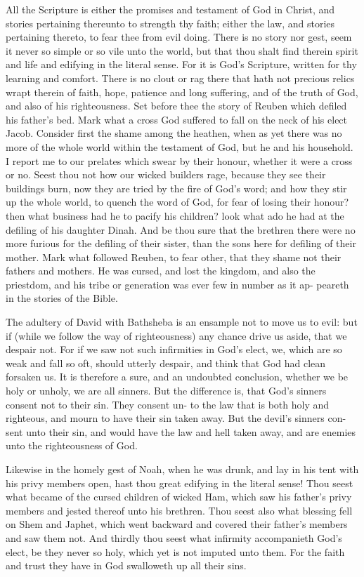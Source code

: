 \documentclass{custom}
\begin{document}
All the Scripture is either the promises and testament of 
God in Christ, and stories pertaining thereunto to strength 
thy faith; either the law, and stories pertaining thereto, to 
fear thee from evil doing. There is no story nor gest, seem it 
never so simple or so vile unto the world, but that thou 
shalt find therein spirit and life and edifying in the literal 
sense. For it is God's Scripture, written for thy learning 
and comfort. There is no clout or rag there that hath not 
precious relics wrapt therein of faith, hope, patience and 
long suffering, and of the truth of God, and also of his 
righteousness. Set before thee the story of Reuben which 
defiled his father's bed. Mark what a cross God suffered 
to fall on the neck of his elect Jacob. Consider first the 
shame among the heathen, when as yet there was no more 
of the whole world within the testament of God, but he and 
his household. I report me to our prelates which swear 
by their honour, whether it were a cross or no. Seest 
thou not how our wicked builders rage, because they see 
their buildings burn, now they are tried by the fire of God's 
word; and how they stir up the whole world, to quench the 
word of God, for fear of losing their honour? then what 
business had he to pacify his children? look what ado he 
had at the defiling of his daughter Dinah. And be thou 
sure that the brethren there were no more furious for the 
defiling of their sister, than the sons here for defiling of 
their mother. Mark what followed Reuben, to fear other, 
that they shame not their fathers and mothers. He was 
cursed, and lost the kingdom, and also the priestdom, and 
his tribe or generation was ever few in number as it ap- 
peareth in the stories of the Bible. 

The adultery of David with Bathsheba is an ensample 
not to move us to evil: but if (while we follow the way of 
righteousness) any chance drive us aside, that we despair 
not. For if we saw not such infirmities in God's elect, we, 
which are so weak and fall so oft, should utterly despair, 
and think that God had clean forsaken us. It is therefore 
a sure, and an undoubted conclusion, whether we be holy 
or unholy, we are all sinners. But the difference is, that 
God's sinners consent not to their sin. They consent un- 
to the law that is both holy and righteous, and mourn to 
have their sin taken away. But the devil's sinners con- 
sent unto their sin, and would have the law and hell taken 
away, and are enemies unto the righteousness of God. 

Likewise in the homely gest of Noah, when he was 
drunk, and lay in his tent with his privy members open, 
hast thou great edifying in the literal sense! Thou seest 
what became of the cursed children of wicked Ham, which 
saw his father's privy members and jested thereof unto his 
brethren. Thou seest also what blessing fell on Shem and 
Japhet, which went backward and covered their father's 
members and saw them not. And thirdly thou seest what 
infirmity accompanieth God's elect, be they never so holy, 
which yet is not imputed unto them. For the faith and 
trust they have in God swalloweth up all their sins. 
\end{document}
